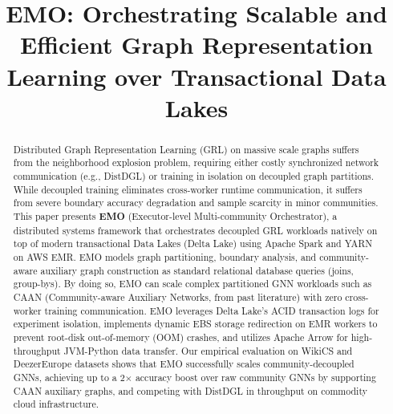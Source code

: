 \documentclass[conference,compsoc]{IEEEtran}
\begin{document}
%
\title{EMO: Orchestrating Scalable and Efficient Graph Representation Learning over Transactional Data Lakes}

\author{
\and
{}
}




\maketitle

\begin{abstract}
Distributed Graph Representation Learning (GRL) on massive scale graphs suffers from the neighborhood explosion problem, requiring either costly synchronized network communication (e.g., DistDGL) or training in isolation on decoupled graph partitions. While decoupled training eliminates cross-worker runtime communication, it suffers from severe boundary accuracy degradation and sample scarcity in minor communities. This paper presents \textbf{EMO} (Executor-level Multi-community Orchestrator), a distributed systems framework that orchestrates decoupled GRL workloads natively on top of modern transactional Data Lakes (Delta Lake) using Apache Spark and YARN on AWS EMR. EMO models graph partitioning, boundary analysis, and community-aware auxiliary graph construction as standard relational database queries (joins, group-bys). By doing so, EMO can scale complex partitioned GNN workloads such as CAAN (Community-aware Auxiliary Networks, from past literature) with zero cross-worker training communication. EMO leverages Delta Lake's ACID transaction logs for experiment isolation, implements dynamic EBS storage redirection on EMR workers to prevent root-disk out-of-memory (OOM) crashes, and utilizes Apache Arrow for high-throughput JVM-Python data transfer. Our empirical evaluation on WikiCS and DeezerEurope datasets shows that EMO successfully scales community-decoupled GNNs, achieving up to a 2$\times$ accuracy boost over raw community GNNs by supporting CAAN auxiliary graphs, and competing with DistDGL in throughput on commodity cloud infrastructure.
\end{abstract}
\end{document}
